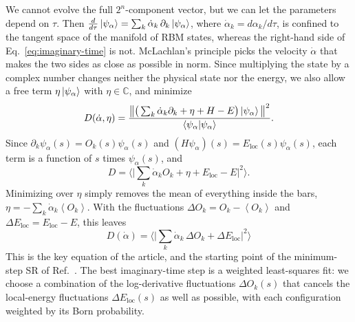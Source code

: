\documentclass[aps,prb,preprint,amsmath,amssymb,nofootinbib,longbibliography]{revtex4-2}
\newcommand{\ev}[1]{\left\langle #1 \right\rangle}
\newcommand{\Eloc}{E_{\mathrm{loc}}}
\begin{document}
We cannot evolve the full $2^n$-component vector, but we can let the parameters depend on $\tau$. Then
$\frac{d}{d\tau}\ket{\psi_\alpha} = \sum_k \dot\alpha_k\,\partial_k\ket{\psi_\alpha}$, where $\dot\alpha_k =
d\alpha_k/d\tau$, is confined to the tangent space of the manifold of RBM states, whereas the right-hand side of
Eq.~\eqref{eq:imaginary-time} is not. McLachlan's principle\cite{mclachlan1964} picks the velocity $\dot\alpha$ that
makes the two sides as close as possible in norm. Since multiplying the state by a complex number changes neither
the physical state nor the energy, we also allow a free term $\eta\ket{\psi_\alpha}$ with $\eta \in \mathbb{C}$, and
minimize
\begin{equation}
  D(\dot\alpha,\eta) = \frac{\big\| \big(\sum_k \dot\alpha_k \partial_k + \eta + H - E\big)\ket{\psi_\alpha} \big\|^2}
  {\braket{\psi_\alpha|\psi_\alpha}} .
\end{equation}
Since $\partial_k\psi_\alpha(s) = O_k(s)\psi_\alpha(s)$ and $(H\psi_\alpha)(s) = \Eloc(s)\psi_\alpha(s)$, each term
is a function of $s$ times $\psi_\alpha(s)$, and
\begin{equation}
  D = \Big\langle \Big| \sum_k \dot\alpha_k O_k + \eta + \Eloc - E \Big|^2 \Big\rangle .
\end{equation}
Minimizing over $\eta$ simply removes the mean of everything inside the bars, $\eta = -\sum_k \dot\alpha_k
\ev{O_k}$. With the fluctuations $\Delta O_k = O_k - \ev{O_k}$ and $\Delta\Eloc = \Eloc - E$, this leaves
\begin{equation}
  \boxed{\; D(\dot\alpha) = \Big\langle \Big| \sum_k \dot\alpha_k\, \Delta O_k + \Delta\Eloc \Big|^2 \Big\rangle \;}
  \label{eq:least-squares}
\end{equation}
This is the key equation of the article, and the starting point of the minimum-step SR of
Ref.~. The best imaginary-time step is a weighted least-squares fit: we choose a combination of
the log-derivative fluctuations $\Delta O_k(s)$ that cancels the local-energy fluctuations $\Delta\Eloc(s)$ as well as
possible, with each configuration weighted by its Born probability.
\end{document}
